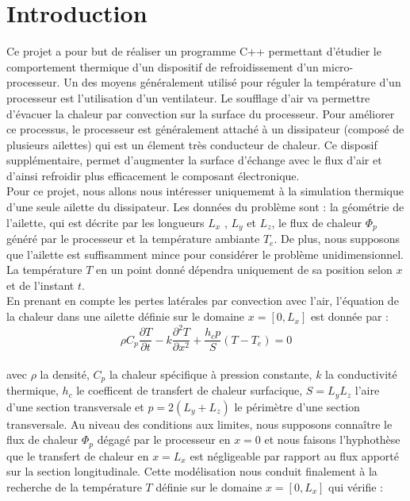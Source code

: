 \documentclass[12pt,a4paper]{article}
\begin{document}
	
	\tableofcontents
	\section{Introduction}

	Ce projet a pour but de réaliser un programme C++ permettant d'étudier le comportement
	thermique d'un dispositif de refroidissement d'un micro-processeur. Un des moyens généralement
	utilisé pour réguler la température d'un processeur est l'utilisation d'un ventilateur. Le soufflage
	d'air va permettre d'évacuer la chaleur par convection sur la surface du processeur. Pour améliorer
	ce processus, le processeur est généralement attaché à un dissipateur (composé de plusieurs ailettes)
	qui est un élement très conducteur de chaleur. Ce disposif supplémentaire,
	permet d'augmenter la surface d'échange avec le flux d'air et d'ainsi refroidir plus efficacement
	le composant électronique.\\
	
	Pour ce projet, nous allons nous intéresser uniquememt à la simulation thermique d'une seule ailette du dissipateur.
	Les données du problème sont : la géométrie de l'ailette, qui est décrite par les longueurs $L_x$ , $L_y$ et $L_z$,
	le flux de chaleur $\Phi_p$ généré par le processeur et la température ambiante $T_e$. De plus, nous supposons que l'ailette est suffisamment
	mince pour considérer le problème unidimensionnel. La température $T$ en un point donné dépendra uniquement de sa position selon $x$ et de l'instant $t$.\\

	En prenant en compte les pertes latérales par convection avec l'air, l'équation de la chaleur dans une ailette 
	définie sur le domaine $x = [0, L_x]$ est donnée par :\\

	$$\rho C_p \frac{\partial T}{\partial t} - k \frac{\partial^2 T}{\partial x^2} + \frac{h_c p}{S} (T - T_e) = 0$$\\

	avec $\rho$ la densité, $C_p$ la chaleur spécifique à pression constante, $k$ la conductivité thermique, $h_c$ le coefficent 
	de transfert de chaleur surfacique, $S = L_yL_z$ l'aire d'une section transversale et $p = 2(L_y + L_z)$ le périmètre d'une section transversale. 
	Au niveau des conditions aux limites, nous supposons connaître le flux de chaleur $\Phi_p$ dégagé par le processeur en $x = 0$ et 
	nous faisons l'hyphothèse que le transfert de chaleur en $x = L_x$ est négligeable par rapport au flux apporté sur la section longitudinale. 
	Cette modélisation nous conduit finalement à la recherche de la température $T$ définie sur le domaine $x = [0, L_x]$ qui vérifie :
\end{document}
